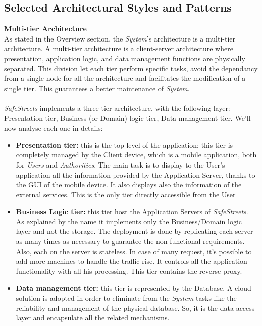 \documentclass{article}
\begin{document}
	\pagebreak
	
	\subsection{Selected Architectural Styles and Patterns}
	{\bf Multi-tier Architecture} \\
	As stated in the Overview section, the {\it System}'s architecture is a multi-tier \mbox{architecture}. A multi-tier architecture is a client-server architecture where presentation, application logic, and data management functions are physically separated. This division let each tier perform specific tasks, avoid the dependancy from a single node for all the architecture and facilitates the modification of a single tier. This guarantees a better maintenance of {\it System}. \\ \\
	{\it SafeStreets} implements a three-tier architecture, with the following layer: Presentation tier, Business (or Domain) logic tier, Data management tier. We'll now analyse each one in details:
	\begin{itemize}
		\item {\bf Presentation tier:} this is the top level of the application; this tier is completely managed by the Client device, which is a mobile application, both for {\it Users} and {\it Authorities}. The main task is to display to the User's application all the information provided by the Application Server, thanks to the GUI of the mobile device. It also displays also the information of the external services. This is the only tier directly accessible from the User 
		\item {\bf Business Logic tier:} this tier host the Application Servers of {\it SafeStreets}. As explained by the name it implements only the Business/Domain logic layer and not the storage. The deployment is done by replicating each server as many times as necessary to guarantee the non-functional requirements. Also, each on the server is stateless. In case of many request, it's possible to add more machines to handle the traffic rise. It controls all the application functionality with all his processing. This tier contains the reverse proxy.		
		\item {\bf Data management tier:} this tier is represented by the Database. A cloud solution is adopted in order to eliminate from the {\it System} tasks like the reliability and management of the physical database. So, it is the data access layer and encapsulate all the related mechanisms.  
	\end{itemize}
\end{document}
